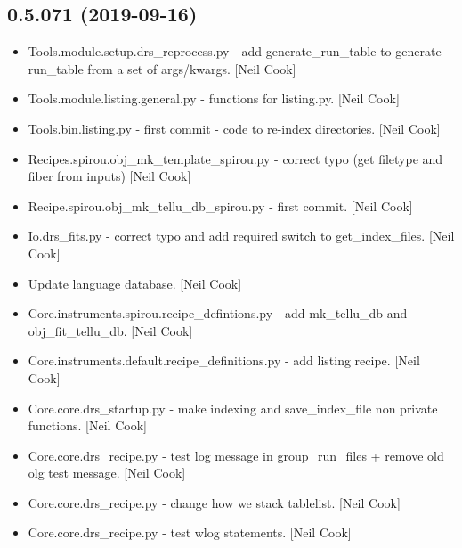 \documentclass[a4paper,10pt,english]{report}
\begin{document}
\subsection{0.5.071 (2019-09-16)}
\label{\detokenize{misc/changelog:id70}}\begin{itemize}
\item {} 
Tools.module.setup.drs\_reprocess.py - add generate\_run\_table to
generate run\_table from a set of args/kwargs. {[}Neil Cook{]}

\item {} 
Tools.module.listing.general.py - functions for listing.py. {[}Neil
Cook{]}

\item {} 
Tools.bin.listing.py - first commit - code to re-index directories.
{[}Neil Cook{]}

\item {} 
Recipes.spirou.obj\_mk\_template\_spirou.py - correct typo (get filetype
and fiber from inputs) {[}Neil Cook{]}

\item {} 
Recipe.spirou.obj\_mk\_tellu\_db\_spirou.py - first commit. {[}Neil Cook{]}

\item {} 
Io.drs\_fits.py - correct typo and add required switch to
get\_index\_files. {[}Neil Cook{]}

\item {} 
Update language database. {[}Neil Cook{]}

\item {} 
Core.instruments.spirou.recipe\_defintions.py - add mk\_tellu\_db and
obj\_fit\_tellu\_db. {[}Neil Cook{]}

\item {} 
Core.instruments.default.recipe\_definitions.py - add listing recipe.
{[}Neil Cook{]}

\item {} 
Core.core.drs\_startup.py - make indexing and save\_index\_file non
private functions. {[}Neil Cook{]}

\item {} 
Core.core.drs\_recipe.py - test log message in group\_run\_files + remove
old olg test message. {[}Neil Cook{]}

\item {} 
Core.core.drs\_recipe.py - change how we stack tablelist. {[}Neil Cook{]}

\item {} 
Core.core.drs\_recipe.py - test wlog statements. {[}Neil Cook{]}


\end{itemize}
\end{document}
